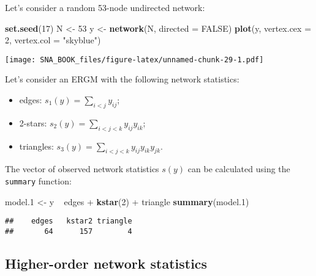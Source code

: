 \documentclass[]{book}
\newenvironment{Shaded}{\begin{snugshade}}{\end{snugshade}}
\newcommand{\KeywordTok}[1]{\textcolor[rgb]{0.13,0.29,0.53}{\textbf{{#1}}}}
\newcommand{\DataTypeTok}[1]{\textcolor[rgb]{0.13,0.29,0.53}{{#1}}}
\newcommand{\DecValTok}[1]{\textcolor[rgb]{0.00,0.00,0.81}{{#1}}}
\newcommand{\FloatTok}[1]{\textcolor[rgb]{0.00,0.00,0.81}{{#1}}}
\newcommand{\StringTok}[1]{\textcolor[rgb]{0.31,0.60,0.02}{{#1}}}
\newcommand{\OtherTok}[1]{\textcolor[rgb]{0.56,0.35,0.01}{{#1}}}
\newcommand{\NormalTok}[1]{{#1}}
\providecommand{\tightlist}{%
  \setlength{\itemsep}{0pt}\setlength{\parskip}{0pt}}
\begin{document}
Let's consider a random 53-node undirected network:

\begin{Shaded}
\begin{Highlighting}[]
\KeywordTok{set.seed}\NormalTok{(}\DecValTok{17}\NormalTok{)}
\NormalTok{N <-}\StringTok{ }\DecValTok{53}
\NormalTok{y <-}\StringTok{ }\KeywordTok{network}\NormalTok{(N, }\DataTypeTok{directed =} \OtherTok{FALSE}\NormalTok{)}
\KeywordTok{plot}\NormalTok{(y, }\DataTypeTok{vertex.cex =} \DecValTok{2}\NormalTok{, }\DataTypeTok{vertex.col =} \StringTok{"skyblue"}\NormalTok{)}
\end{Highlighting}
\end{Shaded}

\texttt{[image: SNA\_BOOK\_files/figure-latex/unnamed-chunk-29-1.pdf]}

Let's consider an ERGM with the following network statistics:

\begin{itemize}
\tightlist
\item
  edges: \(s_1(y) = \sum_{i < j} y_{ij}\);
\item
  2-stars: \(s_2(y) = \sum_{i < j < k} y_{ij}y_{ik}\);
\item
  triangles: \(s_3(y) = \sum_{i < j < k} y_{ij}y_{ik}y_{jk}\).
\end{itemize}

The vector of observed network statistics \(s(y)\) can be calculated
using the \texttt{summary} function:

\begin{Shaded}
\begin{Highlighting}[]
\NormalTok{model}\FloatTok{.1} \NormalTok{<-}\StringTok{ }\NormalTok{y ~}\StringTok{ }\NormalTok{edges +}\StringTok{ }\KeywordTok{kstar}\NormalTok{(}\DecValTok{2}\NormalTok{) +}\StringTok{ }\NormalTok{triangle}
\KeywordTok{summary}\NormalTok{(model}\FloatTok{.1}\NormalTok{)}
\end{Highlighting}
\end{Shaded}

\begin{verbatim}
##    edges   kstar2 triangle 
##       64      157        4
\end{verbatim}

\subsection{Higher-order network
statistics}\label{higher-order-network-statistics}
\end{document}
